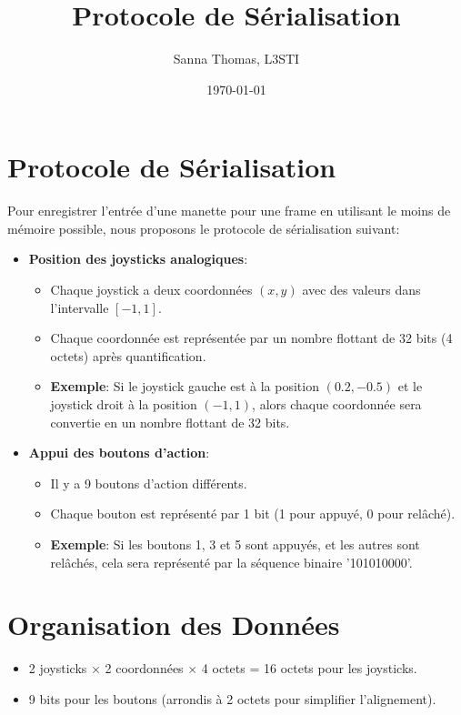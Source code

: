\documentclass{article}
\title{Protocole de Sérialisation}
\author{Sanna Thomas, L3STI}
\date{\today}
\begin{document}
\maketitle

\section*{Protocole de Sérialisation}

Pour enregistrer l'entrée d'une manette pour une frame en utilisant le moins de mémoire possible, nous proposons le protocole de sérialisation suivant:

\begin{itemize}
  \item \textbf{Position des joysticks analogiques}:
  \begin{itemize}
    \item Chaque joystick a deux coordonnées $(x, y)$ avec des valeurs dans l'intervalle $[-1, 1]$.
    \item Chaque coordonnée est représentée par un nombre flottant de 32 bits (4 octets) après quantification.
    \item \textbf{Exemple}: Si le joystick gauche est à la position $(0.2, -0.5)$ et le joystick droit à la position $(-1, 1)$, alors chaque coordonnée sera convertie en un nombre flottant de 32 bits.
  \end{itemize}
  \item \textbf{Appui des boutons d'action}:
  \begin{itemize}
    \item Il y a 9 boutons d'action différents.
    \item Chaque bouton est représenté par 1 bit (1 pour appuyé, 0 pour relâché).
    \item \textbf{Exemple}: Si les boutons 1, 3 et 5 sont appuyés, et les autres sont relâchés, cela sera représenté par la séquence binaire '101010000'.
  \end{itemize}
\end{itemize}

\section*{Organisation des Données}

\begin{itemize}
  \item 2 joysticks $\times$ 2 coordonnées $\times$ 4 octets = 16 octets pour les joysticks.
  \item 9 bits pour les boutons (arrondis à 2 octets pour simplifier l'alignement).
\end{itemize}
\end{document}
